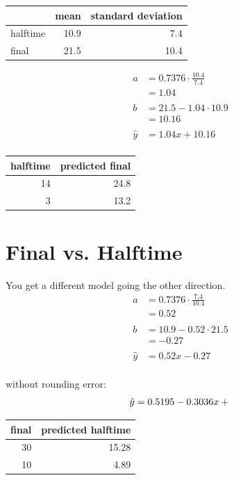 \documentclass[landscape]{exam}
\begin{document}
  \begin{tabular}[H]{lrr}
    \toprule
             & mean & standard deviation \\
    \midrule
    halftime & 10.9 & 7.4 \\
    final    & 21.5 & 10.4 \\
    \bottomrule
  \end{tabular}

  \begin{align*}
    a & = 0.7376 \cdot \frac{10.4}{7.4} \\
      & = 1.04 \\
    \\
    b & = 21.5 - 1.04 \cdot 10.9 \\
      & = 10.16 \\
    \\
    \hat{y} &= 1.04 x + 10.16 \\
  \end{align*}

  \begin{tabular}[H]{rr}
    \toprule
    halftime & predicted final \\
    \midrule
    14       & 24.8 \\
    3        & 13.2 \\
    \bottomrule
  \end{tabular}

  \section{Final vs. Halftime}

  You get a different model going the other direction.
  \begin{align*}
    a & = 0.7376 \cdot \frac{7.4}{10.4} \\
      & = 0.52 \\
    \\
    b & = 10.9 - 0.52 \cdot 21.5 \\
      & = -0.27 \\
    \\
    \hat{y} &= 0.52 x - 0.27 \\
  \end{align*}

  without rounding error:
  \[
    \hat{y} = 0.5195 - 0.3036 x +  \\
  \]

  \begin{tabular}[H]{rr}
    \toprule
    final & predicted halftime \\
    \midrule
    30    & 15.28 \\
    10    & 4.89 \\
    \bottomrule
  \end{tabular}
\end{document}
